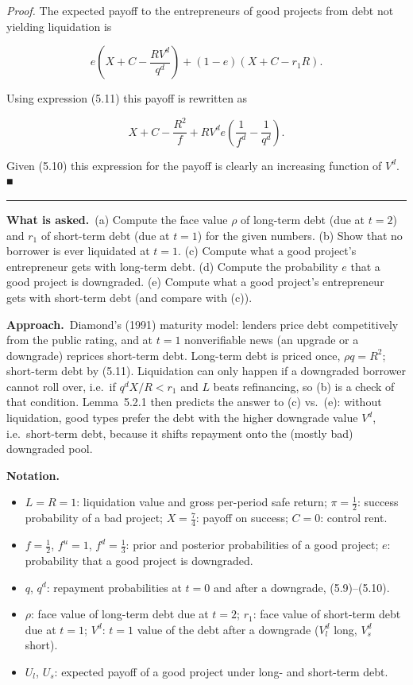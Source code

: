 \documentclass[11pt,a4paper]{article}
\newcommand{\notation}{\par\noindent\textbf{Notation.}}
\newcommand{\asked}{\par\medskip\noindent\textbf{What is asked.}~}
\newcommand{\approach}{\par\smallskip\noindent\textbf{Approach.}~}
\newcommand{\stmtend}{\par\endgroup\nopagebreak\noindent\rule{\linewidth}{0.4pt}\par\medskip}
\begin{document}
\emph{Proof.} The expected payoff to the entrepreneurs of good projects from debt not yielding
liquidation is

\[e\left(X + C - \frac{RV^d}{q^d}\right) + (1 - e)(X + C - r_1 R).\]

Using expression (5.11) this payoff is rewritten as

\[X + C - \frac{R^2}{f} + RV^d e\left(\frac{1}{f^d} - \frac{1}{q^d}\right).\]

Given (5.10) this expression for the payoff is clearly an increasing function of \(V^d\). ■
\stmtend

\asked (a) Compute the face value $\rho$ of long-term debt (due at $t=2$) and $r_1$ of short-term debt
(due at $t=1$) for the given numbers. (b) Show that no borrower is ever liquidated at $t=1$.
(c) Compute what a good project's entrepreneur gets with long-term debt. (d) Compute the probability $e$
that a good project is downgraded. (e) Compute what a good project's entrepreneur gets with short-term
debt (and compare with (c)).

\approach Diamond's (1991) maturity model: lenders price debt competitively from the public rating, and
at $t=1$ nonverifiable news (an upgrade or a downgrade) reprices short-term debt. Long-term debt is
priced once, $\rho q=R^2$; short-term debt by (5.11). Liquidation can only happen if a downgraded
borrower cannot roll over, i.e.\ if $q^dX/R<r_1$ and $L$ beats refinancing, so (b) is a check of that
condition. Lemma~5.2.1 then predicts the answer to (c) vs.\ (e): without liquidation, good types prefer the
debt with the higher downgrade value $V^d$, i.e.\ short-term debt, because it shifts repayment onto the
(mostly bad) downgraded pool.

\notation
\begin{itemize}
  \item $L=R=1$: liquidation value and gross per-period safe return; $\pi=\tfrac12$: success probability of a bad project; $X=\tfrac74$: payoff on success; $C=0$: control rent.
  \item $f=\tfrac12$, $f^u=1$, $f^d=\tfrac13$: prior and posterior probabilities of a good project; $e$: probability that a good project is downgraded.
  \item $q$, $q^d$: repayment probabilities at $t=0$ and after a downgrade, (5.9)--(5.10).
  \item $\rho$: face value of long-term debt due at $t=2$; $r_1$: face value of short-term debt due at $t=1$; $V^d$: $t=1$ value of the debt after a downgrade ($V_l^d$ long, $V_s^d$ short).
  \item $U_l$, $U_s$: expected payoff of a good project under long- and short-term debt.
\end{itemize}
\end{document}
